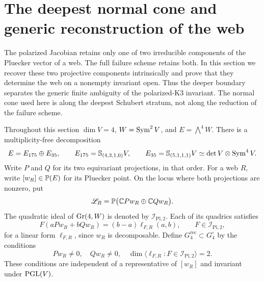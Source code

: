 \section{The deepest normal cone and generic reconstruction of the web}
\label{sec:intrinsic-web-reconstruction}

The polarized Jacobian retains only one of two irreducible components
of the Pluecker vector of a web.  The full failure scheme retains
both.  In this section we recover these two projective components
intrinsically and prove that they determine the web on a nonempty
invariant open.  Thus the deeper boundary separates the generic
finite ambiguity of the polarized-K3 invariant.  The normal cone
used here is along the deepest Schubert stratum, not along the
reduction of the failure scheme.

Throughout this section \(\dim V=4\), \(W=\operatorname{Sym}^2V\), and
\(E=\bigwedge^4W\).  There is a multiplicity-free decomposition
\begin{equation}\label{eq:two-web-components}
 E=E_{175}\oplus E_{35},\qquad
 E_{175}=\mathbb S_{(4,3,1,0)}V,\qquad
 E_{35}=\mathbb S_{(5,1,1,1)}V
       \simeq\det V\otimes\operatorname{Sym}^4V.
\end{equation}
Write \(P\) and \(Q\) for its two equivariant projections, in
that order.  For a web \(R\), write \([w_R]\in\mathbb P(E)\) for
its Pluecker point.  On the locus where both projections are nonzero,
put
\[
 \mathscr L_R=\mathbb P\bigl(\mathbb C Pw_R\oplus\mathbb C Qw_R\bigr).
\]
The quadratic ideal of \(\operatorname{Gr}(4,W)\) is denoted by
\(\mathcal I_{\mathrm{Pl},2}\).  Each of its quadrics satisfies
\begin{equation}\label{eq:plucker-linear-quotient}
 F(aPw_R+bQw_R)=(b-a)\ell_{F,R}(a,b),
 \qquad F\in\mathcal I_{\mathrm{Pl},2},
\end{equation}
for a linear form \(\ell_{F,R}\), since \(w_R\) is decomposable.
Define \(G_4^{\mathrm{rec}}\subset G_4^\circ\) by the conditions
\begin{equation}\label{eq:reconstruction-open}
 Pw_R\ne0,\quad Qw_R\ne0,\quad
 \dim\langle\ell_{F,R}:F\in\mathcal I_{\mathrm{Pl},2}\rangle=2.
\end{equation}
These conditions are independent of a representative of \([w_R]\)
and invariant under \(\operatorname{PGL}(V)\).

